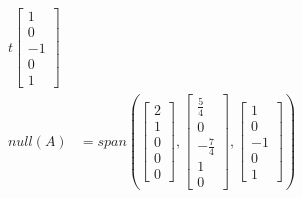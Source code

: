 \documentclass{math}
\begin{document}
\begin{align*}
    t\begin{bmatrix}1 \\ 0 \\ -1 \\ 0 \\ 1\end{bmatrix} \\
  null(A) &= span\left(
    \begin{bmatrix}2 \\ 1 \\ 0 \\ 0 \\ 0\end{bmatrix},
    \begin{bmatrix}\frac{5}{4} \\ 0 \\ -\frac{7}{4} \\ 1 \\ 0\end{bmatrix},
    \begin{bmatrix}1 \\ 0 \\ -1 \\ 0 \\ 1\end{bmatrix}
  \right)
\end{align*}
\end{document}
